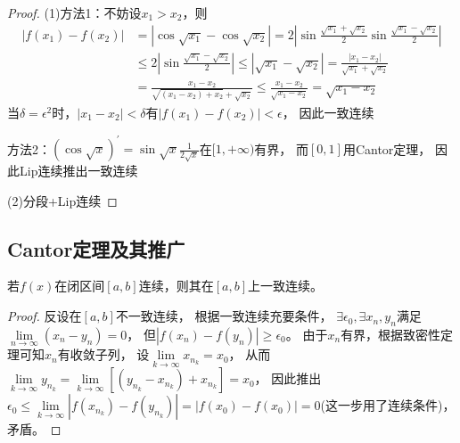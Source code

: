 \begin{proof}
  (1)方法1：不妨设$x_1 > x_2$，则
  \begin{align*}
    |f(x_1) - f(x_2)| &= |\cos \sqrt{x_1} - \cos \sqrt{x_2}| = 2 \left| \sin \frac{\sqrt{x_1} + \sqrt{x_2}}{2} \sin \frac{\sqrt{x_1} - \sqrt{x_2}}{2} \right|\\
   & \leq 2 \left| \sin \frac{\sqrt{x_1} - \sqrt{x_2}}{2} \right| \leq |\sqrt{x_1} - \sqrt{x_2}| = \frac{|x_1 - x_2|}{\sqrt{x_1} + \sqrt{x_2}}\\
    & = \frac{x_1 - x_2}{\sqrt{(x_1 - x_2) + x_2} + \sqrt{x_2}} \leq \frac{x_1 - x_2}{\sqrt{x_1 - x_2}} = \sqrt{x_1 - x_2}
  \end{align*}
  当$\delta = \epsilon^2$时，$|x_1 - x_2| < \delta$有$|f(x_1) - f(x_2)| < \epsilon$，
  因此一致连续

  方法2：$(\cos \sqrt{x})^{\prime} = \sin \sqrt{x} \frac{1}{2 \sqrt{x}}$在$[1,+\infty)$有界，
  而$[0,1]$用Cantor定理，
  因此Lip连续推出一致连续

  (2)分段+Lip连续
\end{proof}


\subsection{Cantor定理及其推广}

\begin{theorem}[Cantor定理]
  若$f(x)$在闭区间$[a,b]$连续，则其在$[a,b]$上一致连续。
\end{theorem}

\begin{proof}
  反设在$[a,b]$不一致连续，
  根据一致连续充要条件，
  $\exists \epsilon_0, \exists x_n,y_n$满足
  $\lim \limits _{n \rightarrow \infty} (x_n - y_n) = 0$，
  但$|f(x_n) - f(y_n)| \geq \epsilon_0$。
  由于$x_n$有界，根据致密性定理可知$x_n$有收敛子列，
  设$\lim \limits _{k \rightarrow \infty}x_{n_k} = x_0$，
  从而$\lim \limits _{k \rightarrow \infty}y_{n_k} = \lim \limits _{k \rightarrow \infty}[(y_{n_k} - x_{n_k}) + x_{n_k}] = x_0$，
  因此推出$\epsilon_0 \leq \lim \limits _{k \rightarrow \infty}|f(x_{n_k}) - f(y_{n_k})| = |f(x_0) -f(x_0)| = 0$(这一步用了连续条件)，
  矛盾。
\end{proof}

